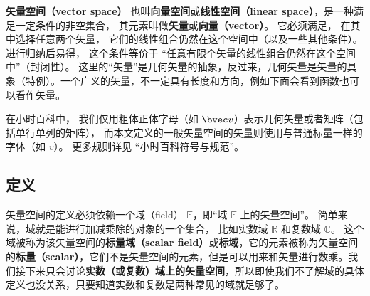 

\textbf{矢量空间（vector space）} 也叫\textbf{向量空间}或\textbf{线性空间（linear space）}，是一种满足一定条件的非空集合， 其元素叫做\textbf{矢量}或\textbf{向量（vector）}。 它必须满足， 在其中选择任意两个矢量， 它们的线性组合仍然在这个空间中（以及一些其他条件）。 进行归纳后易得， 这个条件等价于 “任意有限个矢量的线性组合仍然在这个空间中”（封闭性）。 这里的“矢量”是几何矢量的抽象，反过来，几何矢量是矢量的具象（特例）。一个广义的矢量，不一定具有长度和方向，例如下面会看到函数也可以看作矢量。

在小时百科中， 我们仅用粗体正体字母（如 $\bvec v$）表示几何矢量或者矩阵（包括单行单列的矩阵）， 而本文定义的一般矢量空间的矢量则使用与普通标量一样的字体（如 $v$）。 更多规则详见 “小时百科符号与规范”。

\subsection{定义}
矢量空间的定义必须依赖一个域（field） $\mathbb F$，即“域 $\mathbb{F}$ 上的矢量空间”。 简单来说，域就是能进行加减乘除的对象的一个集合， 比如实数域 $\mathbb R$ 和复数域 $\mathbb C$。 这个域被称为该矢量空间的\textbf{标量域（scalar field）}或\textbf{标域}，它的元素被称为矢量空间的\textbf{标量（scalar）}，它们不是矢量空间的元素，但是可以用来和矢量进行数乘。我们接下来只会讨论\textbf{实数（或复数）域上的矢量空间}，所以即使我们不了解域的具体定义也没关系，只要知道实数和复数是两种常见的域就足够了。

